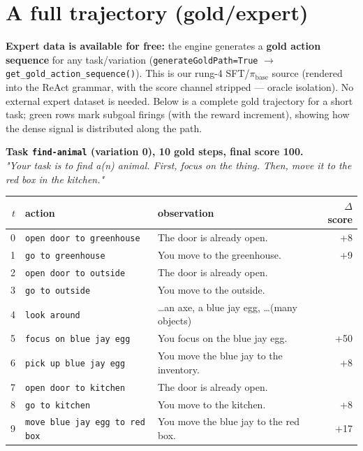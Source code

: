 \documentclass[10pt]{article}
\newcommand{\cmd}[1]{\texttt{\small #1}}
\begin{document}
\section{A full trajectory (gold/expert)}
\textbf{Expert data is available for free:} the engine generates a \textbf{gold action sequence} for any
task/variation (\cmd{generateGoldPath=True} $\rightarrow$ \cmd{get\_gold\_action\_sequence()}). This is our
rung-4 SFT/$\pi_\text{base}$ source (rendered into the ReAct grammar, with the score channel stripped ---
oracle isolation). No external expert dataset is needed. Below is a complete gold trajectory for a short
task; green rows mark subgoal firings (with the reward increment), showing how the dense signal is
distributed along the path.

\smallskip
\noindent\textbf{Task \cmd{find-animal} (variation 0), 10 gold steps, final score 100.}\\
\textit{"Your task is to find a(n) animal. First, focus on the thing. Then, move it to the red box in the kitchen."}
\begin{center}\small
\begin{tabular}{r>{\raggedright\arraybackslash}p{5.2cm}>{\raggedright\arraybackslash}p{6.5cm}r}
\rowcolor{hdr}\hline
$t$ & action & observation & $\Delta$score \\ \hline
0 & \cmd{open door to greenhouse} & The door is already open. & \cellcolor{fire}+8 \\
1 & \cmd{go to greenhouse} & You move to the greenhouse. & \cellcolor{fire}+9 \\
2 & \cmd{open door to outside} & The door is already open. & \\
3 & \cmd{go to outside} & You move to the outside. & \\
4 & \cmd{look around} & \dots an axe, a blue jay egg, \dots (many objects) & \\
5 & \cmd{focus on blue jay egg} & You focus on the blue jay egg. & \cellcolor{fire}+50 \\
6 & \cmd{pick up blue jay egg} & You move the blue jay to the inventory. & \cellcolor{fire}+8 \\
7 & \cmd{open door to kitchen} & The door is already open. & \\
8 & \cmd{go to kitchen} & You move to the kitchen. & \cellcolor{fire}+8 \\
9 & \cmd{move blue jay egg to red box} & You move the blue jay to the red box. & \cellcolor{fire}+17 \\ \hline
\end{tabular}
\end{center}
\end{document}
